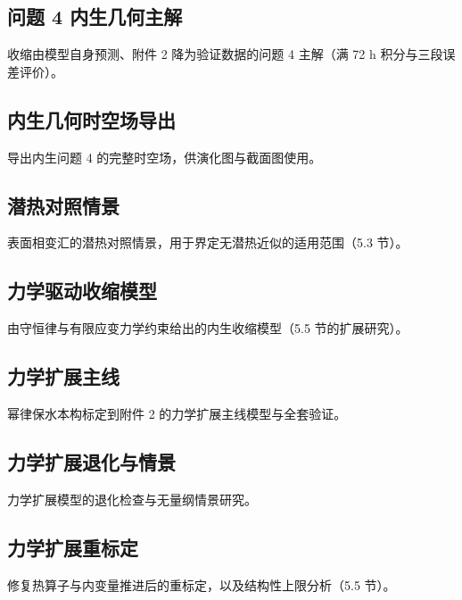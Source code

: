 \documentclass[12pt,a4paper]{ctexart}
\numberwithin{equation}{section}
\begin{document}
\subsection{问题 4 内生几何主解}
收缩由模型自身预测、附件 2 降为验证数据的问题 4 主解（满 72 h 积分与三段误差评价）。


\subsection{内生几何时空场导出}
导出内生问题 4 的完整时空场，供演化图与截面图使用。


\subsection{潜热对照情景}
表面相变汇的潜热对照情景，用于界定无潜热近似的适用范围（5.3 节）。


\subsection{力学驱动收缩模型}
由守恒律与有限应变力学约束给出的内生收缩模型（5.5 节的扩展研究）。


\subsection{力学扩展主线}
幂律保水本构标定到附件 2 的力学扩展主线模型与全套验证。


\subsection{力学扩展退化与情景}
力学扩展模型的退化检查与无量纲情景研究。


\subsection{力学扩展重标定}
修复热算子与内变量推进后的重标定，以及结构性上限分析（5.5 节）。

\end{document}
